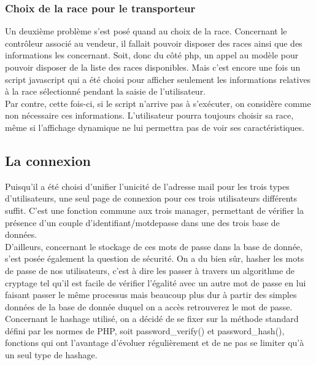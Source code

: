 \documentclass{article}
\begin{document}
\subsubsection{Choix de la race pour le transporteur} 
Un deuxième problème s'est posé quand au choix de la race. Concernant le contrôleur associé au vendeur, il fallait pouvoir disposer des races ainsi que des informations les concernant. Soit, donc du côté php, un appel au modèle pour pouvoir disposer de la liste des races disponibles.
Mais c'est encore une fois un script javascript qui a été choisi pour afficher seulement les informations relatives à la race sélectionné pendant la saisie de l'utilisateur. 
\\
Par contre, cette fois-ci, si le script n'arrive pas à s'exécuter, on considère comme non nécessaire ces informations. L'utilisateur pourra toujours choisir sa race, même si l'affichage dynamique ne lui permettra pas de voir ses caractéristiques. 

\subsection{La connexion}
Puisqu'il a été choisi d'unifier l'unicité de l'adresse mail pour les trois types d'utilisateurs, une seul page de connexion pour ces trois utilisateurs différents suffit. 
C'est une fonction commune aux trois manager, permettant de vérifier la présence d'un couple d'identifiant/motdepasse dans une des trois base de données. 
\\
D'ailleurs, concernant le stockage de ces mots de passe dans la base de donnée, s'est posée également la question de sécurité. On a du bien sûr, hasher les mots de passe de nos utilisateurs, c'est à dire les passer à travers un algorithme de cryptage tel qu'il est facile de vérifier l'égalité avec un autre mot de passe en lui faisant passer le même processus mais beaucoup plus dur à partir des simples données de la base de donnée duquel on a accès retrouverez le mot de passe. 
\\ Concernant le hashage utilisé, on a décidé de se fixer sur la méthode standard défini par les normes de PHP, soit password\_verify() et password\_hash(), fonctions qui ont l'avantage d'évoluer régulièrement et de ne pas se limiter qu'à un seul type de hashage. 
\\
\end{document}
